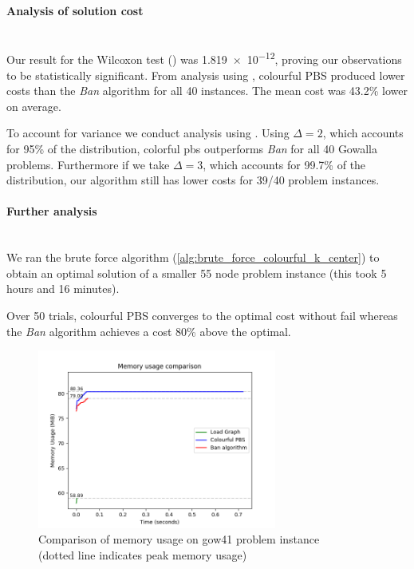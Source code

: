 

\paragraph{Analysis of solution cost}~\\
Our result for the Wilcoxon test () was \num{1.819e-12}, proving our observations to be statistically significant. From analysis using , colourful PBS produced lower costs than the \emph{Ban} algorithm for all 40 instances. The mean cost was 43.2\% lower on average.

To account for variance we conduct analysis using . Using $\Delta =2$, which accounts for 95\% of the distribution, colorful \acrshort{pbs} outperforms \emph{Ban} for all 40 Gowalla problems. Furthermore if we take $\Delta =3$, which accounts for 99.7\% of the distribution, our algorithm still has lower costs for 39/40 problem instances.

\paragraph{Further analysis}~\\
We ran the brute force algorithm (\cref{alg:brute_force_colourful_k_center}) to obtain an optimal solution of a smaller 55 node problem instance (this took 5 hours and 16 minutes).



Over 50 trials, colourful PBS converges to the optimal cost without fail whereas the \emph{Ban} algorithm achieves a cost 80\% above the optimal.

\begin{figure}[H]
    \centering
    \includegraphics[width=0.7\textwidth]{images/memory_usage.png}
    \caption{Comparison of memory usage on gow41 problem instance\\ (dotted line indicates peak memory usage)}
    \label{fig:memory_usage}
\end{figure}

